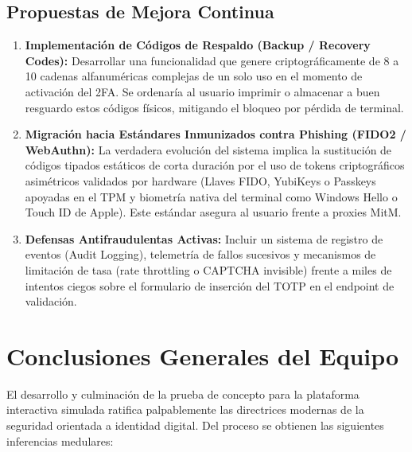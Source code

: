 \documentclass[12pt,a4paper]{article}
\begin{document}
\subsection{Propuestas de Mejora Continua}
\begin{enumerate}
    \item \textbf{Implementación de Códigos de Respaldo (Backup / Recovery Codes):} Desarrollar una funcionalidad que genere criptográficamente de 8 a 10 cadenas alfanuméricas complejas de un solo uso en el momento de activación del 2FA. Se ordenaría al usuario imprimir o almacenar a buen resguardo estos códigos físicos, mitigando el bloqueo por pérdida de terminal.
    \item \textbf{Migración hacia Estándares Inmunizados contra Phishing (FIDO2 / WebAuthn):} La verdadera evolución del sistema implica la sustitución de códigos tipados estáticos de corta duración por el uso de tokens criptográficos asimétricos validados por hardware (Llaves FIDO, YubiKeys o Passkeys apoyadas en el TPM y biometría nativa del terminal como Windows Hello o Touch ID de Apple). Este estándar asegura al usuario frente a proxies MitM.
    \item \textbf{Defensas Antifraudulentas Activas:} Incluir un sistema de registro de eventos (Audit Logging), telemetría de fallos sucesivos y mecanismos de limitación de tasa (rate throttling o CAPTCHA invisible) frente a miles de intentos ciegos sobre el formulario de inserción del TOTP en el endpoint de validación.
\end{enumerate}

\section{Conclusiones Generales del Equipo}

El desarrollo y culminación de la prueba de concepto para la plataforma interactiva simulada ratifica palpablemente las directrices modernas de la seguridad orientada a identidad digital. Del proceso se obtienen las siguientes inferencias medulares:
\end{document}
